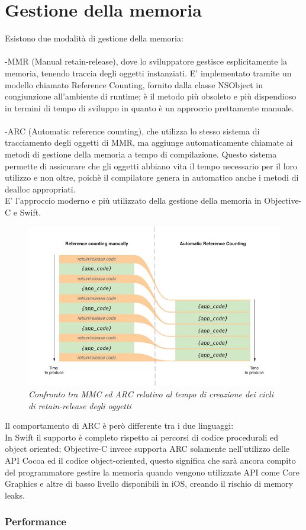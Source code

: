 \section{Gestione della memoria}
Esistono due modalità di gestione della memoria:\\
\\-MMR (Manual retain-release), dove lo sviluppatore gestisce esplicitamente la memoria, tenendo traccia degli oggetti instanziati. E' implementato tramite un modello chiamato Reference Counting, fornito dalla classe NSObject in congiunzione all'ambiente di runtime; è il metodo più obsoleto e più dispendioso in termini di tempo di sviluppo in quanto è un approccio prettamente manuale.\\
\\-ARC (Automatic reference counting), che utilizza lo stesso sistema di tracciamento degli oggetti di MMR, ma aggiunge automaticamente chiamate ai metodi di gestione della memoria a tempo di compilazione. Questo sistema permette di assicurare che gli oggetti abbiano vita il tempo necessario per il loro utilizzo e non oltre, poichè il compilatore genera in automatico anche i metodi di dealloc appropriati.\\E' l'approccio moderno e più utilizzato della gestione della memoria in Objective-C e Swift.
\begin{figure}[H]
      \centering
      \includegraphics[scale=0.40]{immagini/ARC.jpg}
            \vspace{0.8cm}
            \caption{\textit{Confronto tra MMC ed ARC relativo al tempo di creazione dei cicli di retain-release degli oggetti}}
    \end{figure}
Il comportamento di ARC è però differente tra i due linguaggi:\\
In Swift il supporto è completo rispetto ai percorsi di codice procedurali ed object oriented; Objective-C invece supporta ARC solamente nell'utilizzo delle API Cocoa ed il codice object-oriented, questo significa che sarà ancora compito del programmatore gestire la memoria quando vengono utilizzate API come Core Graphics e altre di basso livello disponibili in iOS, creando il rischio di memory leaks.
\subsubsection{Performance}



